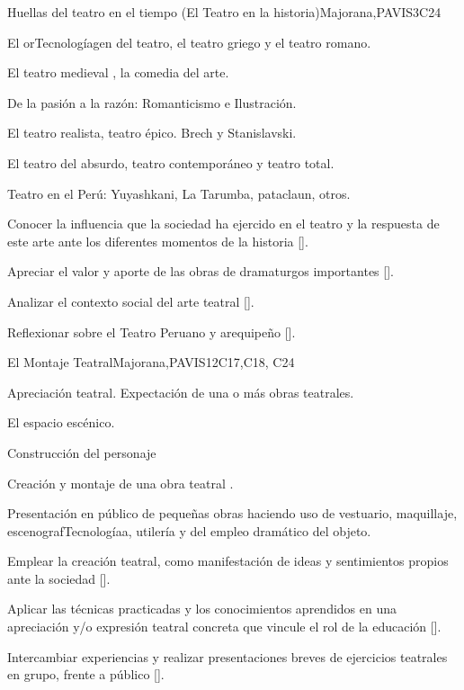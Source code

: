 \begin{syllabus}
\begin{unit}{}{Huellas del teatro en el tiempo  (El Teatro en la historia)}{Majorana,PAVIS}{3}{C24}
\begin{topics}
	\item El orTecnologíagen del teatro, el teatro griego y el teatro romano.
	\item El teatro medieval , la comedia del arte.
	\item De la pasión a la razón: Romanticismo e Ilustración.
	\item El teatro realista, teatro épico. Brech  y  Stanislavski.
	\item El teatro del absurdo, teatro contemporáneo y teatro total.
	\item Teatro en el Perú: Yuyashkani, La Tarumba, pataclaun, otros.
\end{topics}
\begin{learningoutcomes}
	\item Conocer la influencia que la sociedad ha ejercido en el teatro y la respuesta de este arte ante los diferentes momentos de la historia [\Usage].
	\item Apreciar el valor y aporte de las obras de dramaturgos importantes [\Usage].
	\item Analizar el contexto social del arte teatral [\Usage].
	\item Reflexionar sobre el Teatro Peruano y arequipeño [\Usage].
\end{learningoutcomes}
\end{unit}

\begin{unit}{}{El  Montaje Teatral}{Majorana,PAVIS}{12}{C17,C18, C24}
\begin{topics}
	\item Apreciación teatral. Expectación de una o más obras teatrales.
	\item El espacio escénico.
	\item Construcción del personaje
	\item Creación y montaje de una obra teatral .
	\item Presentación en público de pequeñas obras haciendo uso de vestuario, maquillaje, escenografTecnologíaa, utilería y del empleo dramático del objeto.
\end{topics}
\begin{learningoutcomes}
	\item Emplear  la creación teatral, como manifestación de ideas y sentimientos propios ante la sociedad [\Usage].
	\item Aplicar las técnicas practicadas y los conocimientos aprendidos en una apreciación y/o expresión teatral concreta que vincule el rol de la educación [\Usage].
	\item Intercambiar experiencias y realizar presentaciones breves de ejercicios teatrales en grupo, frente a público [\Usage].
\end{learningoutcomes}
\end{unit}

\begin{coursebibliography}
\end{coursebibliography}

\end{syllabus}
